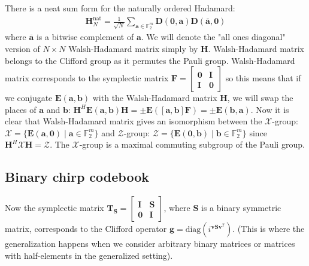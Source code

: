 \documentclass{article}
\begin{document}
There is a neat sum form for the naturally ordered Hadamard:
\begin{align*}
	\mathbf{H}^{\text{nat}}_N = \frac{1}{\sqrt{N}} \sum_{\mathbf{a} \in \mathbb{F}_2^m} \mathbf{D}(\mathbf{0}, \mathbf{a}) \mathbf{D}(\overline{\mathbf{a}}, \mathbf{0})
\end{align*}
where $\overline{\mathbf{a}}$ is a bitwise complement of $\mathbf{a}$. We will denote the "all ones diagonal" version of $N \times N$ Walsh-Hadamard matrix simply by $\mathbf{H}$. 
	Walsh-Hadamard matrix belongs to the Clifford group as it permutes the Pauli group. Walsh-Hadamard matrix corresponds to the symplectic matrix $\mathbf{F} = \begin{bmatrix}
		\mathbf{0} & \mathbf{I} \\
		\mathbf{I} & \mathbf{0}
	\end{bmatrix}$
	so this means that if we conjugate $\mathbf{E}(\mathbf{a},\mathbf{b})$ with the Walsh-Hadamard matrix $\mathbf{H}$, we will swap the places of $\mathbf{a}$ and $\mathbf{b}$: $\mathbf{H}^H\mathbf{E}(\mathbf{a},\mathbf{b})\mathbf{H} = \pm \mathbf{E}(\left[\mathbf{a},\mathbf{b}\right]\mathbf{F}) = \pm \mathbf{E}(\mathbf{b},\mathbf{a})$. Now it is clear that Walsh-Hadamard matrix gives an isomorphism between the $\mathcal{X}$-group: $\mathcal{X} = \{\mathbf{E}(\mathbf{a},\mathbf{0}) \mid \mathbf{a} \in \mathbb{F}^m_2 \}$ and $\mathcal{Z}$-group: $\mathcal{Z} = \{\mathbf{E}(\mathbf{0},\mathbf{b}) \mid \mathbf{b} \in \mathbb{F}^m_2 \}$ since $\mathbf{H}^H\mathcal{X}\mathbf{H} = \mathcal{Z}$. The $\mathcal{X}$-group is a maximal commuting subgroup of the Pauli group.
	\subsection*{Binary chirp codebook}
	Now the symplectic matrix $\mathbf{T}_\mathbf{S} = \begin{bmatrix} \mathbf{I} & \mathbf{S} \\ \mathbf{0} & \mathbf{I} \end{bmatrix}$, where $\mathbf{S}$ is a binary symmetric matrix, corresponds to the Clifford operator $\mathbf{g} = \text{diag}(i^{\mathbf{v}\mathbf{S}\mathbf{v}^T})$. (This is where the generalization happens when we consider arbitrary binary matrices or matrices with half-elements in the generalized setting).
	
	
\end{document}

